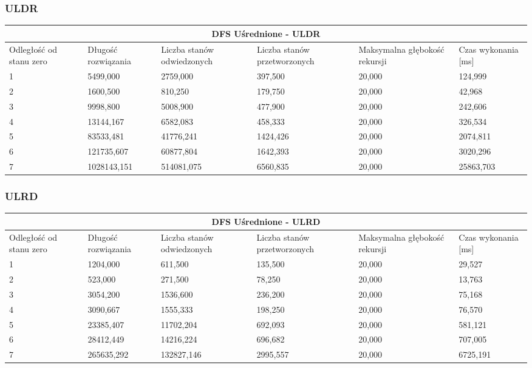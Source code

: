 \documentclass{classrep}
\begin{document}
{\subsubsection{ULDR}
\begin{center}
	\begin{tabular}{ | p{1.6cm} | p{2cm} | p{2cm} | p{2cm} | p{2.2cm} | p{2cm} | }
	\hline
	\multicolumn{6}{|c|}{DFS Uśrednione - ULDR} \\
	\hline
	Odległość od stanu zero & Długość rozwiązania & Liczba stanów odwiedzonych & Liczba stanów przetworzonych & Maksymalna głębokość rekursji & Czas wykonania [ms]\\
	\hline
	1 &5499,000&2759,000&397,500&20,000&124,999\\
	\hline
	2 &1600,500&810,250&179,750&20,000&42,968\\
	\hline
	3 &9998,800&5008,900&477,900&20,000&242,606\\
	\hline
	4 &13144,167&6582,083&458,333&20,000&326,534\\
	\hline
	5 &83533,481&41776,241&1424,426&20,000&2074,811\\
	\hline
	6 &121735,607&60877,804&1642,393&20,000&3020,296\\
	\hline
	7 &1028143,151&514081,075&6560,835&20,000&25863,703\\
	\hline
	\end{tabular}
\end{center}

\subsubsection{ULRD}
\begin{center}
	\begin{tabular}{ | p{1.6cm} | p{2cm} | p{2cm} | p{2cm} | p{2.2cm} | p{2cm} | }
	\hline
	\multicolumn{6}{|c|}{DFS Uśrednione - ULRD} \\
	\hline
	Odległość od stanu zero & Długość rozwiązania & Liczba stanów odwiedzonych & Liczba stanów przetworzonych & Maksymalna głębokość rekursji & Czas wykonania [ms]\\
	\hline
	1 &1204,000&611,500&135,500&20,000&29,527\\
	\hline
	2&523,000&271,500&78,250&20,000&13,763\\
	\hline
	3 &3054,200&1536,600&236,200&20,000&75,168\\
	\hline
	4 &3090,667&1555,333&198,250&20,000&76,570\\
	\hline
	5&23385,407&11702,204&692,093&20,000&581,121\\
	\hline
	6 &28412,449&14216,224&696,682&20,000&707,005\\
	\hline
	7&265635,292&132827,146&2995,557&20,000&6725,191\\
	\hline
	\end{tabular}
\end{center}

}
\end{document}
